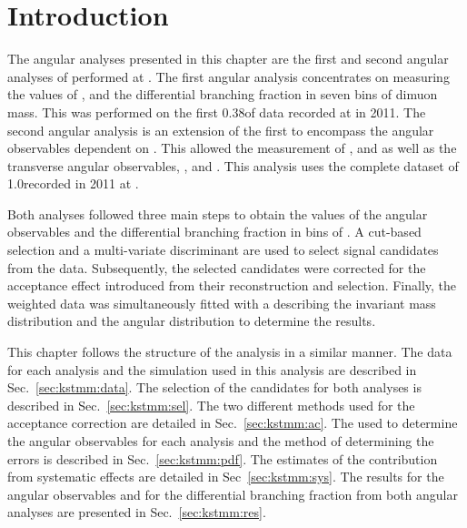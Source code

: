 \section{Introduction}

The angular analyses presented in this chapter are
the first and second angular analyses of \BdToKstmm performed at \lhcb. 
The first angular analysis concentrates on measuring the values of 
\AFB, \FL and the differential branching fraction in seven bins of dimuon mass. 
This was performed on the first 0.38\invfb of  data recorded at \lhcb in 2011. 
The second angular analysis is an extension of the first to encompass the 
angular observables dependent on \varphi. This allowed the measurement of ,  and 
 as well as the transverse angular observables, \ATRe, \ATIm and  .
This analysis uses the complete dataset of 1.0\invfb recorded in 2011 at \lhcb. 

Both analyses followed three main steps to obtain the values of the angular observables 
and the differential branching fraction in bins of \qsq.
A cut-based selection and a multi-variate discriminant are used to select signal \BdToKstmm candidates from the data.
Subsequently, the selected \BdToKstmm candidates were corrected for the acceptance effect introduced from their reconstruction and selection.
Finally, the weighted data was simultaneously fitted with a \PDF describing the
 \Bd invariant mass distribution and the angular distribution to determine the results.

This chapter follows the structure of the analysis in a similar manner.
The data for each analysis and the simulation used in this analysis are described in 
Sec.~\ref{sec:kstmm:data}. 
The selection of the \kpimm candidates for both analyses is described in Sec.~\ref{sec:kstmm:sel}. 
The two different methods used for the acceptance correction are detailed in Sec.~\ref{sec:kstmm:ac}.
The \PDF used to determine the angular observables for each analysis and the method of determining the errors
 is described in Sec.~\ref{sec:kstmm:pdf}. 
The estimates of the contribution from systematic effects are detailed in Sec~\ref{sec:kstmm:sys}. 
The results for the angular observables and for the differential branching fraction 
from both angular analyses are presented in Sec.~\ref{sec:kstmm:res}.